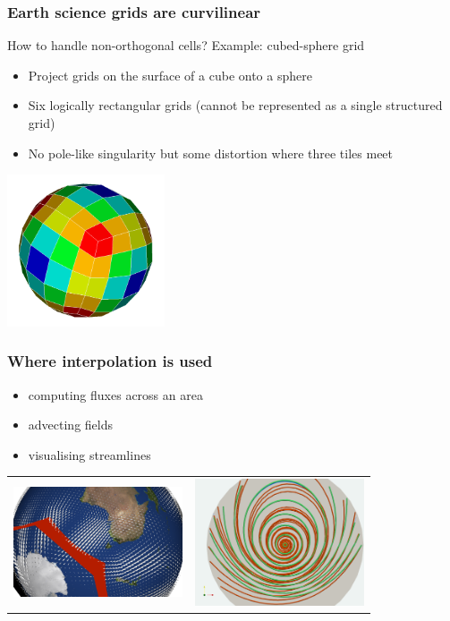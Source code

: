 \documentclass[aspectratio=169]{beamer}
\begin{document}
\begin{frame}[t]
  \frametitle{Earth science grids are curvilinear}
  \begin{block}{How to handle non-orthogonal cells? Example: cubed-sphere grid}
    \begin{itemize}
      \item Project grids on the surface of a cube onto a sphere
      \item Six logically rectangular grids (cannot be represented as a single structured grid)
      \item No pole-like singularity but some distortion where three tiles meet 
    \end{itemize}
  \end{block}
  \begin{center}
    \includegraphics[width=0.35\textwidth]{cubedSphere.png}
  \end{center}
\end{frame}

\begin{frame}[t]
  \frametitle{Where interpolation is used}
  \begin{itemize}
   \item computing fluxes across an area
   \item advecting fields
   \item visualising streamlines
  \end{itemize}
    \begin{tabular}{lr}
      \includegraphics[width=50mm]{fluxIntegral.png} & 
      \includegraphics[width=50mm]{streamLineError.png} 
    \end{tabular}  
\end{frame}
\end{document}
